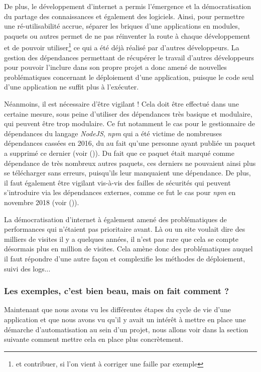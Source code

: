 De plus, le développement d'internet a permis l'émergence et la démocratisation du partage des connaissances et également des logiciels. Ainsi, pour permettre une ré-utilisabilité accrue, séparer les briques d'une applications en modules, paquets ou autres permet de ne pas réinventer la route à chaque développement et de pouvoir utiliser\footnote{et contribuer, si l'on vient à corriger une faille par exemple} ce qui a été déjà réalisé par d'autres développeurs. La gestion des dépendances permettant de récupérer le travail d'autres développeurs pour pouvoir l'inclure dans son propre projet a donc amené de nouvelles problématiques concernant le déploiement d'une application, puisque le code seul d'une application ne suffit plus à l'exécuter. 

Néanmoins, il est nécessaire d'être vigilant ! Cela doit être effectué dans une certaine mesure, sous peine d'utiliser des dépendances très basique et modulaire, qui peuvent être trop modulaire. Ce fut notamment le cas pour le gestionnaire de dépendances du langage \emph{NodeJS}, \emph{npm} qui a été victime de nombreuses dépendances cassées en 2016, du au fait qu'une personne ayant publiée un paquet a supprimé ce dernier (voir  \cite{npm-missing-deps} ()). Du fait que ce paquet était marqué comme dépendance de très nombreux autres paquets, ces derniers ne pouvaient ainsi plus se télécharger sans erreurs, puisqu'ils leur manquaient une dépendance. De plus, il faut également être vigilant vis-à-vis des failles de sécurités qui peuvent s'introduire via les dépendances externes, comme ce fut le cas pour \emph{npm} en novembre 2018 (voir  \cite{npm-faille} ()).

La démocratisation d'internet à également amené des problématiques de performances qui n'étaient pas prioritaire avant. Là ou un site  voulait dire des milliers de visites il y a quelques années, il n'est pas rare que cela se compte désormais plus en million de visites. Cela amène donc des problématiques auquel il faut répondre d'une autre façon et complexifie les méthodes de déploiement, suivi des logs...


\subsubsection{Les exemples, c'est bien beau, mais on fait comment ?}


Maintenant que nous avons vu les différentes étapes du cycle de vie d'une application et que nous avons vu qu'il y avait un intérêt à mettre en place une démarche d'automatisation au sein d'un projet, nous allons voir dans la section suivante comment mettre cela en place plus concrètement.